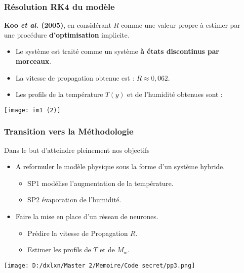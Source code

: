 \documentclass[handout]{beamer}
\newtheorem{pbm et hypo}[thm]{Problématique et hypothèses}
\begin{document}
	\begin{frame}
		\frametitle{Résolution RK4 du modèle}
		
		\textbf{Koo \textit{et al.} (2005)}, en considérant $R$ comme une valeur propre à estimer par une procédure \textbf{d'optimisation} implicite.\pause
		
		\pause
		\begin{itemize}
			\item Le système est traité comme un système \textbf{à états discontinus par morceaux}.
			\item La vitesse de propagation obtenue est : \textbf{$R \approx 0{,}062$}.
			\item Les profils de la température $T(y)$ et de l'humidité obtenues sont : \pause 
		\end{itemize}
		
		\pause
		\begin{center}
			\texttt{[image: im1 (2)]}
		\end{center}
	\end{frame}
	\begin{frame}
		\frametitle{Transition vers la Méthodologie \aquarius}
		Dans le but d'atteindre pleinement nos objectifs \pause
		\begin{itemize}
			\item[\maltese] A reformuler le modèle physique sous la forme d’un système hybride. \pause
			\begin{itemize}
				\item SP1 modélise l'augmentation de la température. 
				\item SP2 évaporation de l'humidité. 
			\end{itemize} \pause 
			\item[\maltese] Faire la mise en place d'un réseau de neurones. \pause
			\begin{itemize}
				\item Prédire la vitesse de Propagation $R$. 
				\item Estimer les profils de $T$ et de $M_w$. 
			\end{itemize}
		\end{itemize}
	\end{frame}
	
	\begin{frame}[plain]
		\noindent
		\texttt{[image: D:/dxlxn/Master 2/Memoire/Code secret/pp3.png]}
	\end{frame}
	
\end{document}

